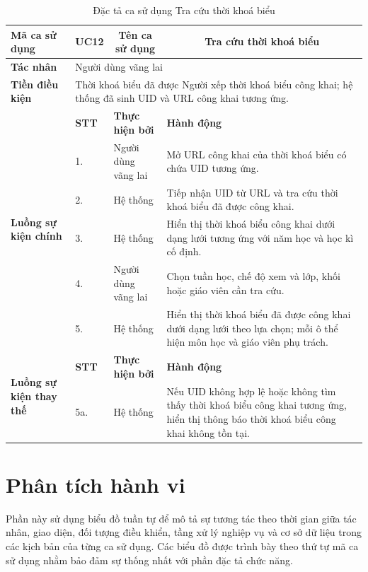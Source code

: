 \documentclass[../DoAn.tex]{subfiles}
\begin{document}
\begin{longtable}{|p{2.8cm}|p{1cm}|p{2.8cm}|p{6.3cm}|}
\caption{Đặc tả ca sử dụng Tra cứu thời khoá biểu}
\label{tab:uc_tra_cuu_tkb} \\
\hline
\multicolumn{1}{|l|}{\textbf{Mã ca sử dụng}} & \multicolumn{1}{c|}{UC12} & \multicolumn{1}{c|}{\textbf{Tên ca sử dụng}} & \multicolumn{1}{c|}{Tra cứu thời khoá biểu} \\
\hline
\multicolumn{1}{|l|}{\textbf{Tác nhân}} & \multicolumn{3}{l|}{Người dùng vãng lai} \\
\hline
\multicolumn{1}{|l|}{\textbf{Tiền điều kiện}} & \multicolumn{3}{p{10.5cm}|}{Thời khoá biểu đã được Người xếp thời khoá biểu công khai; hệ thống đã sinh UID và URL công khai tương ứng.} \\
\hline
\multirow{6}{2.8cm}{\textbf{Luồng sự kiện chính}} & \textbf{STT} & \textbf{Thực hiện bởi} & \textbf{Hành động} \\
\cline{2-4}
& 1. & Người dùng vãng lai & Mở URL công khai của thời khoá biểu có chứa UID tương ứng. \\
\cline{2-4}
& 2. & Hệ thống & Tiếp nhận UID từ URL và tra cứu thời khoá biểu đã được công khai. \\
\cline{2-4}
& 3. & Hệ thống & Hiển thị thời khoá biểu công khai dưới dạng lưới tương ứng với năm học và học kì cố định. \\
\cline{2-4}
& 4. & Người dùng vãng lai & Chọn tuần học, chế độ xem và lớp, khối hoặc giáo viên cần tra cứu. \\
\cline{2-4}
& 5. & Hệ thống & Hiển thị thời khoá biểu đã được công khai dưới dạng lưới theo lựa chọn; mỗi ô thể hiện môn học và giáo viên phụ trách. \\
\hline
\multirow{2}{2.8cm}{\textbf{Luồng sự kiện thay thế}} & \textbf{STT} & \textbf{Thực hiện bởi} & \textbf{Hành động} \\
\cline{2-4}
& 5a. & Hệ thống & Nếu UID không hợp lệ hoặc không tìm thấy thời khoá biểu công khai tương ứng, hiển thị thông báo thời khoá biểu công khai không tồn tại. \\
\hline
\end{longtable}

\section{Phân tích hành vi}
\label{section:2.5}
\begingroup
\raggedbottom

Phần này sử dụng biểu đồ tuần tự để mô tả sự tương tác theo thời gian giữa tác
nhân, giao diện, đối tượng điều khiển, tầng xử lý nghiệp vụ và cơ sở dữ liệu
trong các kịch bản của từng ca sử dụng. Các biểu đồ được trình bày theo thứ tự
mã ca sử dụng nhằm bảo đảm sự thống nhất với phần đặc tả chức năng.
\end{document}

